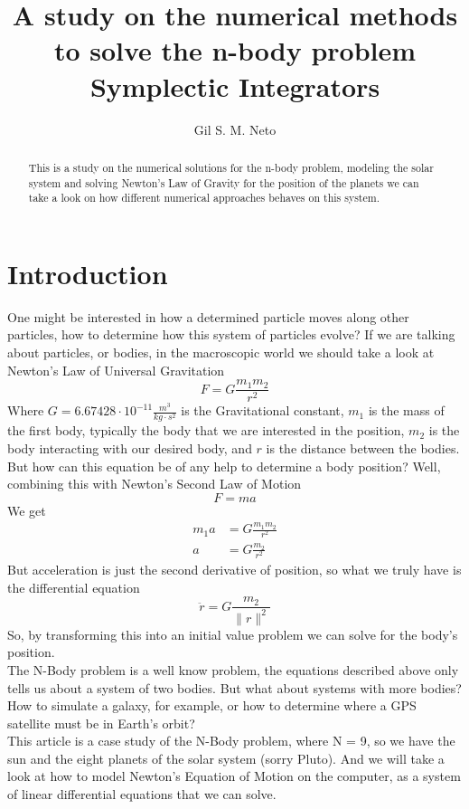 \documentclass[12pt]{article}
\title{A study on the numerical methods to solve the n-body problem\\Symplectic Integrators}
\author{Gil S. M. Neto}
\begin{document}
\maketitle

\begin{abstract}
  This is a study on the numerical solutions for the n-body problem, modeling
  the solar system and solving Newton's Law of Gravity for the position of the planets we can take a look on how different numerical approaches behaves on this system.\\

\end{abstract}

\section{Introduction}
One might be interested in how a determined particle moves along other particles, how to determine how this system of particles evolve? If we are talking about particles, or bodies, in the macroscopic world we should take a look at Newton's Law of Universal Gravitation\\
\[
F = G \frac{m_1m_2}{r^2}
\]
Where \(G = 6.67428 \cdot 10^{-11} \frac{m^3}{kg\cdot s^2}\) is the Gravitational constant, \(m_1\) is the mass of the first body, typically the body that we are interested in the position, \(m_2\) is the body interacting with our desired body, and \(r\) is the distance between the bodies.\\
But how can this equation be of any help to determine a body position? Well, combining this with Newton's Second Law of Motion
\[
F = ma
\]
We get
\begin{align*}
m_1a &= G \frac{m_1m_2}{r^2}\\
a &= G \frac{m_2}{r^2}
\end{align*}
But acceleration is just the second derivative of position, so what we truly have is the differential equation
\[
\ddot{r} = G \frac{m_2}{\lVert r \rVert^2}
\]
So, by transforming this into an initial value problem we can solve for the body's position.\\
The N-Body problem is a well know problem, the equations described above only tells us about a system of two bodies. But what about systems with more bodies? How to simulate a galaxy, for example, or how to determine where a GPS satellite must be in Earth's orbit?\\
This article is a case study of the N-Body problem, where N = 9, so we have the sun and the eight planets of the solar system (sorry Pluto). And we will take a look at how to model Newton's Equation of Motion on the computer, as a system of linear differential equations that we can solve.
\end{document}
